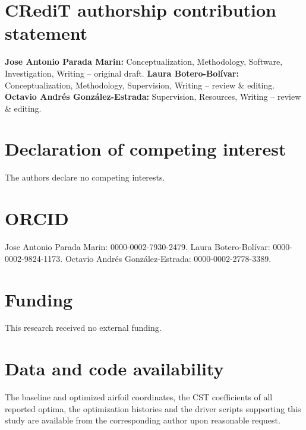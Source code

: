 \documentclass[preprint,3p,times]{elsarticle}
\begin{document}
\section*{CRediT authorship contribution statement}
\textbf{Jose Antonio Parada Marin:} Conceptualization, Methodology, Software,
Investigation, Writing -- original draft. \textbf{Laura Botero-Bol\'ivar:}
Conceptualization, Methodology, Supervision, Writing -- review \& editing.
\textbf{Octavio Andr\'es Gonz\'alez-Estrada:} Supervision, Resources,
Writing -- review \& editing.

\section*{Declaration of competing interest}
The authors declare no competing interests.

\section*{ORCID}
Jose Antonio Parada Marin: 0000-0002-7930-2479.
Laura Botero-Bol\'ivar: 0000-0002-9824-1173.
Octavio Andr\'es Gonz\'alez-Estrada: 0000-0002-2778-3389.

\section*{Funding}
This research received no external funding.

\section*{Data and code availability}
The baseline and optimized airfoil coordinates, the CST coefficients of all
reported optima, the optimization histories and the driver scripts supporting
this study are available from the corresponding author upon reasonable
request.

\FloatBarrier



\end{document}
